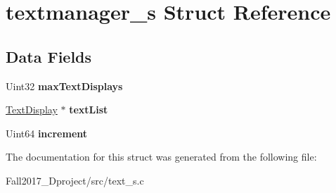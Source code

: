 \hypertarget{structtextmanager__s}{}\section{textmanager\+\_\+s Struct Reference}
\label{structtextmanager__s}
\subsection*{Data Fields}
\begin{DoxyCompactItemize}
\item 
\mbox{\label{structtextmanager__s_aad759ca5b5ca2719b916d629df38aafb}} 
Uint32 {\bfseries max\+Text\+Displays}
\item 
\mbox{\label{structtextmanager__s_a06b3b86095c6b01a4b2a4f69376167e0}} 
\hyperlink{structtextdisplay__s}{Text\+Display} $\ast$ {\bfseries text\+List}
\item 
\mbox{\label{structtextmanager__s_ab08657e2d8ce2eb598d448722ef0959b}} 
Uint64 {\bfseries increment}
\end{DoxyCompactItemize}


The documentation for this struct was generated from the following file\+:\begin{DoxyCompactItemize}
\item 
Fall2017\+\_\+Dproject/src/text\+\_\+s.\+c\end{DoxyCompactItemize}
